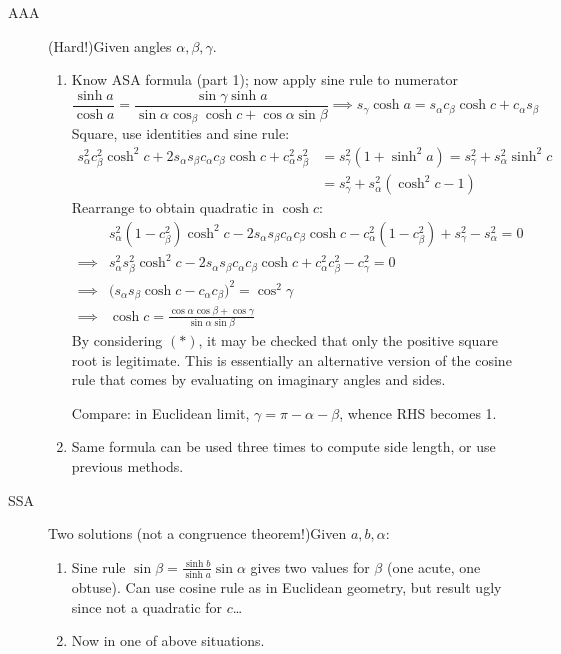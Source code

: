 \begin{description}
	\item[AAA] (Hard!)\lstsp Given angles $\alpha,\beta,\gamma$.
	\begin{enumerate}
	  \item Know ASA formula (part 1); now apply sine rule to numerator
	  \[\frac{\sinh a}{\cosh a}=\frac{\sin\gamma\sinh a}{\sin\alpha\cos_\beta\cosh c+ \cos\alpha\sin\beta} \implies s_\gamma\cosh a=s_\alpha c_\beta\cosh c+c_\alpha s_\beta \tag{$\ast$}\]
	  Square, use identities and sine rule:
		\begin{align*}
			s^2_\alpha c^2_\beta\cosh^2c+2s_\alpha s_\beta c_\alpha c_\beta\cosh c+c_\alpha^2s^2_\beta &=s^2_\gamma(1+\sinh^2a) =s_\gamma^2+s_\alpha^2\sinh^2c\\
			&=s_\gamma^2+s_\alpha^2(\cosh^2c-1)
		\end{align*}
		Rearrange to obtain quadratic in $\cosh c$:
		\begin{align*}
			&s_\alpha^2(1-c_\beta^2)\cosh^2c-2s_\alpha s_\beta c_\alpha c_\beta\cosh c -c_\alpha^2(1-c^2_\beta)+s^2_\gamma-s^2_\alpha=0\\
			\implies &s_\alpha^2s_\beta^2\cosh^2c-2s_\alpha s_\beta c_\alpha c_\beta\cosh c +c_\alpha^2c^2_\beta-c^2_\gamma=0\\
			\implies &\bigl(s_\alpha s_\beta\cosh c-c_\alpha c_\beta\bigr)^2=\cos^2\gamma\\
			\implies &\cosh c=\frac{\cos\alpha\cos\beta+\cos\gamma}{\sin\alpha\sin\beta}
		\end{align*}
		By considering $(\ast)$, it may be checked that only the positive square root is legitimate. This is essentially an alternative version of the cosine rule that comes by evaluating on imaginary angles and sides.\par
		Compare: in Euclidean limit, $\gamma=\pi-\alpha-\beta$, whence RHS becomes 1.
		\item Same formula can be used three times to compute side length, or use previous methods.
	\end{enumerate}
	  
	\item[SSA] Two solutions (not a congruence theorem!)\lstsp Given $a,b,\alpha$:
	\begin{enumerate}
	  \item Sine rule $\sin\beta=\frac{\sinh b}{\sinh a}\sin\alpha$ gives two values for $\beta$ (one acute, one obtuse). Can use cosine rule as in Euclidean geometry, but result ugly since not a quadratic for $c$\ldots
	  \item Now in one of above situations.
	\end{enumerate}
\end{description}
